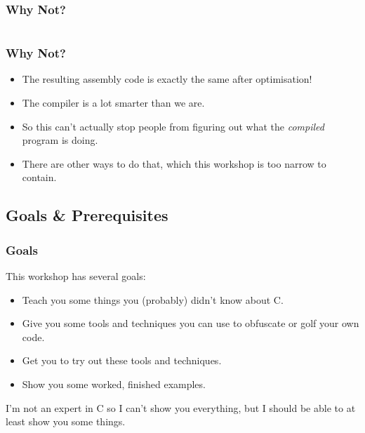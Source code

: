 \documentclass[handout,xcolor]{beamer}
\begin{document}
\begin{frame}
	\frametitle{Why Not?}
	\pause
	
	\begin{columns}
		\begin{column}{0.45\textwidth}
			\centering
			
		\end{column}
		\begin{column}{0.45\textwidth}
			\centering
			
		\end{column}
	\end{columns}
\end{frame}

\begin{frame}
	\frametitle{Why Not?}
	\pause
	
	\begin{itemize}
		\item The resulting assembly code is exactly the same after optimisation!
		\pause
		\item The compiler is a lot smarter than we are.
		\pause
		\item So this can't actually stop people from figuring out what the \textit{compiled} program is doing.
		\pause
		\item There are other ways to do that, which this workshop is too narrow to contain.
	\end{itemize}
\end{frame}

\subsection{Goals \& Prerequisites}

\begin{frame}
	\frametitle{Goals}
	\pause
	
	This workshop has several goals:
	\pause
	
	\begin{itemize}
		\item Teach you some things you (probably) didn't know about C.
		\pause
		\item Give you some tools and techniques you can use to obfuscate or golf your own code.
		\pause
		\item Get you to try out these tools and techniques.
		\pause
		\item Show you some worked, finished examples.
	\end{itemize}
	\pause
	
	I'm not an expert in C so I can't show you everything, but I should be able to at least show you some things.
\end{frame}
\end{document}
